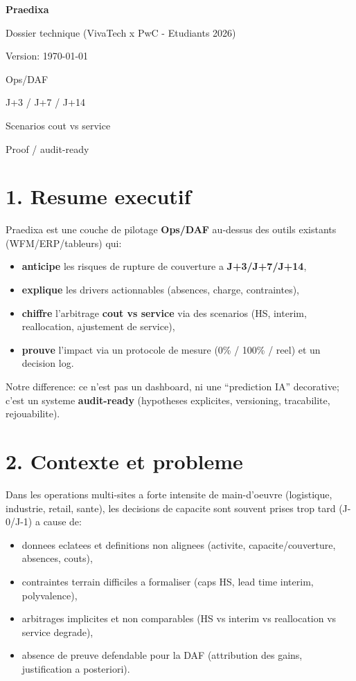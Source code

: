 \documentclass[11pt,a4paper]{article}
\newcommand{\pill}[1]{\colorbox{PraedixaLight}{\strut\hspace{0.4em}\textsf{\small #1}\hspace{0.4em}}}
\begin{document}
\begin{center}
  {\LARGE \textbf{Praedixa} \par}
  \vspace{2mm}
  {\large Dossier technique (VivaTech x PwC - Etudiants 2026) \par}
  \vspace{2mm}
  {\small Version: \today \par}
  \vspace{4mm}
  \pill{Ops/DAF} \hspace{2mm}
  \pill{J+3 / J+7 / J+14} \hspace{2mm}
  \pill{Scenarios cout vs service} \hspace{2mm}
  \pill{Proof / audit-ready}
\end{center}

\vspace{4mm}

\section*{1. Resume executif}
Praedixa est une couche de pilotage \textbf{Ops/DAF} au-dessus des outils existants (WFM/ERP/tableurs) qui:
\begin{itemize}
  \item \textbf{anticipe} les risques de rupture de couverture a \textbf{J+3/J+7/J+14},
  \item \textbf{explique} les drivers actionnables (absences, charge, contraintes),
  \item \textbf{chiffre} l'arbitrage \textbf{cout vs service} via des scenarios (HS, interim, reallocation, ajustement de service),
  \item \textbf{prouve} l'impact via un protocole de mesure (0\% / 100\% / reel) et un decision log.
\end{itemize}
Notre difference: ce n'est pas un dashboard, ni une ``prediction IA'' decorative; c'est un systeme \textbf{audit-ready} (hypotheses explicites, versioning, tracabilite, rejouabilite).

\section*{2. Contexte et probleme}
Dans les operations multi-sites a forte intensite de main-d'oeuvre (logistique, industrie, retail, sante), les decisions de capacite sont souvent prises trop tard (J-0/J-1) a cause de:
\begin{itemize}
  \item donnees eclatees et definitions non alignees (activite, capacite/couverture, absences, couts),
  \item contraintes terrain difficiles a formaliser (caps HS, lead time interim, polyvalence),
  \item arbitrages implicites et non comparables (HS vs interim vs reallocation vs service degrade),
  \item absence de preuve defendable pour la DAF (attribution des gains, justification a posteriori).
\end{itemize}
\end{document}
